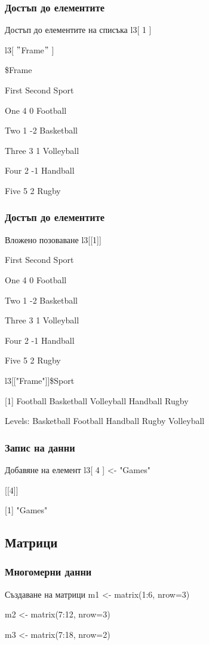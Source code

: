\documentclass{beamer}
\begin{document}
\begin{frame}
\frametitle{Достъп до елементите}
\begin{block}{Достъп до елементите на списъка}
l3[ 1 ]

l3[ $"$Frame$"$ ]

\$Frame

      First Second      Sport

One       4      0   Football

Two       1     -2 Basketball

Three     3      1 Volleyball

Four      2     -1   Handball

Five      5      2      Rugby

\end{block}
\end{frame}

\begin{frame}
\frametitle{Достъп до елементите}
\begin{block}{Вложено позоваване}
l3[[1]]

      First Second      Sport

One       4      0   Football

Two       1     -2 Basketball

Three     3      1 Volleyball

Four      2     -1   Handball

Five      5      2      Rugby

l3[["Frame"]]\$Sport

[1] Football   Basketball Volleyball Handball   Rugby     

Levels: Basketball Football Handball Rugby Volleyball
\end{block}
\end{frame}

\begin{frame}
\frametitle{Запис на данни}
\begin{block}{Добавяне на елемент}
l3[ 4 ] <- "Games"

[[4]]

[1] "Games"
\end{block}
\end{frame}

\subsection{Матрици}

\begin{frame}
\frametitle{Многомерни данни}
\begin{block}{Създаване на матрици}
m1 <- matrix(1:6, nrow=3)

m2 <- matrix(7:12, nrow=3)

m3 <- matrix(7:18, nrow=2)
\end{block}
\end{frame}
\end{document}
